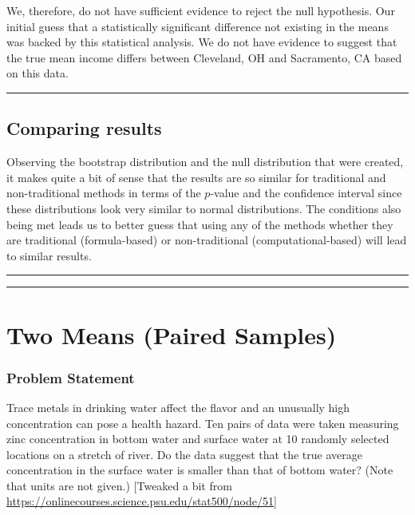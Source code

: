 \documentclass[]{tufte-book}
\let\oldrule=\rule
\renewcommand{\rule}[1]{\oldrule{\linewidth}}
\begin{document}
We, therefore, do not have sufficient evidence to reject the null
hypothesis. Our initial guess that a statistically significant
difference not existing in the means was backed by this statistical
analysis. We do not have evidence to suggest that the true mean income
differs between Cleveland, OH and Sacramento, CA based on this data.

\begin{center}\rule{0.5\linewidth}{\linethickness}\end{center}

\subsection{Comparing results}\label{comparing-results-3}

Observing the bootstrap distribution and the null distribution that were
created, it makes quite a bit of sense that the results are so similar
for traditional and non-traditional methods in terms of the \(p\)-value
and the confidence interval since these distributions look very similar
to normal distributions. The conditions also being met leads us to
better guess that using any of the methods whether they are traditional
(formula-based) or non-traditional (computational-based) will lead to
similar results.

\begin{center}\rule{0.5\linewidth}{\linethickness}\end{center}

\begin{center}\rule{0.5\linewidth}{\linethickness}\end{center}

\section{Two Means (Paired Samples)}\label{two-means-paired-samples}

\subsubsection{Problem Statement}\label{problem-statement-4}

Trace metals in drinking water affect the flavor and an unusually high
concentration can pose a health hazard. Ten pairs of data were taken
measuring zinc concentration in bottom water and surface water at 10
randomly selected locations on a stretch of river. Do the data suggest
that the true average concentration in the surface water is smaller than
that of bottom water? (Note that units are not given.) {[}Tweaked a bit
from \url{https://onlinecourses.science.psu.edu/stat500/node/51}{]}
\end{document}
